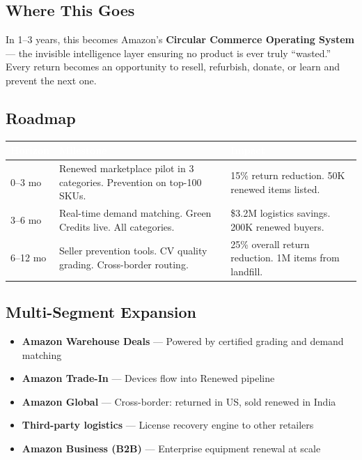\documentclass[11pt,a4paper]{article}
\begin{document}
\subsection{Where This Goes}
In 1--3 years, this becomes Amazon's \textbf{Circular Commerce Operating System} --- the invisible intelligence layer ensuring no product is ever truly ``wasted.'' Every return becomes an opportunity to resell, refurbish, donate, or learn and prevent the next one.

\subsection{Roadmap}
\begin{tabularx}{\textwidth}{|l|X|X|}
\hline
\rowcolor{amazondark}\textcolor{white}{\textbf{Horizon}} & \textcolor{white}{\textbf{Milestone}} & \textcolor{white}{\textbf{Impact}} \\
\hline
0--3 mo & Renewed marketplace pilot in 3 categories. Prevention on top-100 SKUs. & 15\% return reduction. 50K renewed items listed. \\
\hline
3--6 mo & Real-time demand matching. Green Credits live. All categories. & \$3.2M logistics savings. 200K renewed buyers. \\
\hline
6--12 mo & Seller prevention tools. CV quality grading. Cross-border routing. & 25\% overall return reduction. 1M items from landfill. \\
\hline
\end{tabularx}

\subsection{Multi-Segment Expansion}
\begin{itemize}[noitemsep]
\item \textbf{Amazon Warehouse Deals} --- Powered by certified grading and demand matching
\item \textbf{Amazon Trade-In} --- Devices flow into Renewed pipeline
\item \textbf{Amazon Global} --- Cross-border: returned in US, sold renewed in India
\item \textbf{Third-party logistics} --- License recovery engine to other retailers
\item \textbf{Amazon Business (B2B)} --- Enterprise equipment renewal at scale
\end{itemize}
\end{document}
